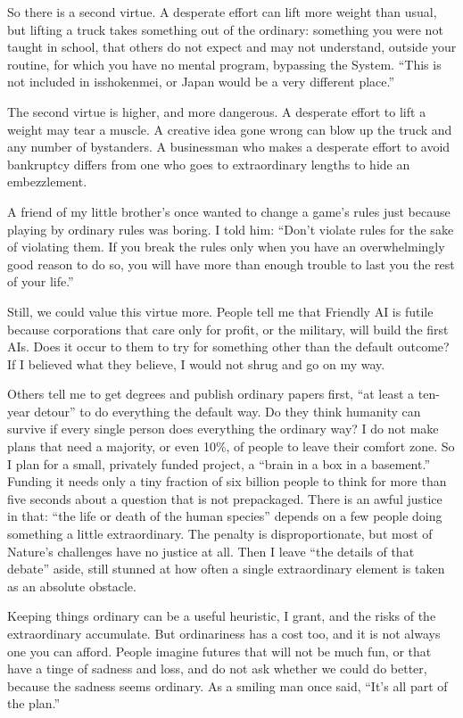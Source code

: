 So there is a second virtue. A desperate effort can lift more weight than usual, but lifting a truck takes something out of the ordinary: something you were not taught in school, that others do not expect and may not understand, outside your routine, for which you have no mental program, bypassing the System. ``This is not included in isshokenmei, or Japan would be a very different place.''

The second virtue is higher, and more dangerous. A desperate effort to lift a weight may tear a muscle. A creative idea gone wrong can blow up the truck and any number of bystanders. A businessman who makes a desperate effort to avoid bankruptcy differs from one who goes to extraordinary lengths to hide an embezzlement.

A friend of my little brother's once wanted to change a game's rules just because playing by ordinary rules was boring. I told him: ``Don't violate rules for the sake of violating them. If you break the rules only when you have an overwhelmingly good reason to do so, you will have more than enough trouble to last you the rest of your life.''

Still, we could value this virtue more. People tell me that Friendly AI is futile because corporations that care only for profit, or the military, will build the first AIs. Does it occur to them to try for something other than the default outcome? If I believed what they believe, I would not shrug and go on my way.

Others tell me to get degrees and publish ordinary papers first, ``at least a ten-year detour'' to do everything the default way. Do they think humanity can survive if every single person does everything the ordinary way? I do not make plans that need a majority, or even 10\%, of people to leave their comfort zone. So I plan for a small, privately funded project, a ``brain in a box in a basement.'' Funding it needs only a tiny fraction of six billion people to think for more than five seconds about a question that is not prepackaged. There is an awful justice in that: ``the life or death of the human species'' depends on a few people doing something a little extraordinary. The penalty is disproportionate, but most of Nature's challenges have no justice at all. Then I leave ``the details of that debate'' aside, still stunned at how often a single extraordinary element is taken as an absolute obstacle. 

Keeping things ordinary can be a useful heuristic, I grant, and the risks of the extraordinary accumulate. But ordinariness has a cost too, and it is not always one you can afford. People imagine futures that will not be much fun, or that have a tinge of sadness and loss, and do not ask whether we could do better, because the sadness seems ordinary. As a smiling man once said, ``It's all part of the plan.'' 

